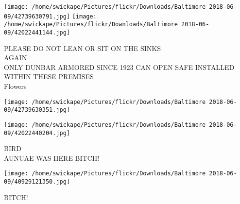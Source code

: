 \documentclass[10pt,letterpaper]{article}
\begin{document}
\texttt{[image: /home/swickape/Pictures/flickr/Downloads/Baltimore 2018-06-09/42739630791.jpg]}
\texttt{[image: /home/swickape/Pictures/flickr/Downloads/Baltimore 2018-06-09/42022441144.jpg]}

PLEASE DO NOT LEAN OR SIT ON THE SINKS\\
AGAIN\\
ONLY DUNBAR ARMORED SINCE 1923 CAN OPEN SAFE INSTALLED WITHIN THESE PREMISES\\
Flowers\\
\pagebreak

\texttt{[image: /home/swickape/Pictures/flickr/Downloads/Baltimore 2018-06-09/42739630351.jpg]}

\vspace{0.25in}
\texttt{[image: /home/swickape/Pictures/flickr/Downloads/Baltimore 2018-06-09/42022440204.jpg]}

BIRD\\
AUNUAE WAS HERE BITCH!\\
\pagebreak

\texttt{[image: /home/swickape/Pictures/flickr/Downloads/Baltimore 2018-06-09/40929121350.jpg]}

BITCH!\\
\pagebreak
\end{document}
